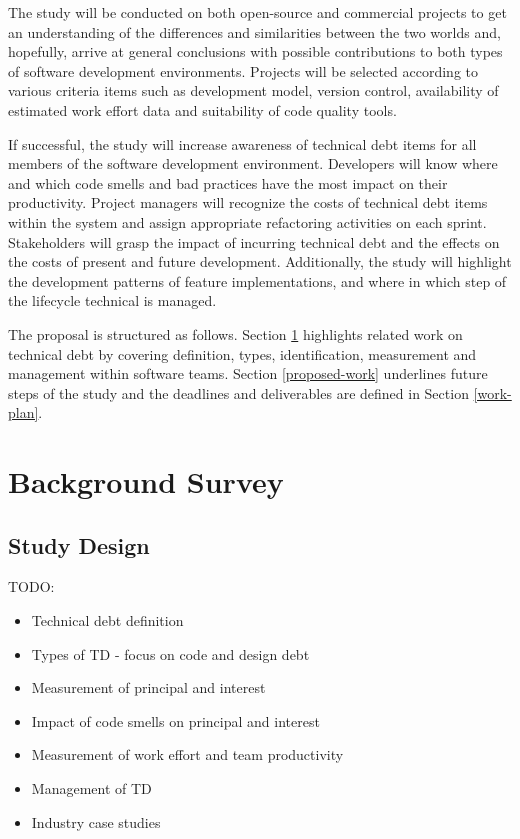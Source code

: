 \documentclass{mprop}
\begin{document}
The study will be conducted on both open-source and commercial projects to get
an understanding of the differences and similarities between the two worlds and,
hopefully, arrive at general conclusions with possible contributions to both
types of software development environments. Projects will be selected according
to various criteria items such as development model, version control,
availability of estimated work effort data and suitability of code quality
tools.

If successful, the study will increase awareness of technical debt items for all
members of the software development environment. Developers will know where and
which code smells and bad practices have the most impact on their productivity.
Project managers will recognize the costs of technical debt items within the
system and assign appropriate refactoring activities on each sprint.
Stakeholders will grasp the impact of incurring technical debt and the effects
on the costs of present and future development. Additionally, the study will
highlight the development patterns of feature implementations, and where in
which step of the lifecycle technical is managed.

The proposal is structured as follows. Section \ref{lit-review} highlights
related work on technical debt by covering definition, types, identification,
measurement and management within software teams. Section \ref{proposed-work}
underlines future steps of the study and the deadlines and deliverables are
defined in Section \ref{work-plan}.

\section{Background Survey}
\label{lit-review}

\subsection{Study Design}

TODO:
\begin{itemize}
	\item Technical debt definition
	\item Types of TD - focus on code and design debt
	\item Measurement of principal and interest
	\item Impact of code smells on principal and interest
	\item Measurement of work effort and team productivity
	\item Management of TD
	\item Industry case studies
\end{itemize}
\end{document}
